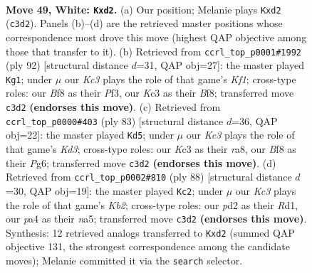 \documentclass[11pt]{article}
\begin{document}
\clearpage

\begin{figure}[p]\centering
\begin{subfigure}{0.46\textwidth}\centering
\resizebox{\linewidth}{!}{%
\newchessgame
\chessboard[
  setfen={5B2/5p1k/5n2/8/p3p2p/P1K4P/1P1p1PR1/1r6 w - - 0 49},
  showmover=false,
  pgfstyle=straightmove, color=movearrow, markmove={c3-d2}
]}
\caption{}
\end{subfigure}\hfill
\begin{subfigure}{0.46\textwidth}\centering
\resizebox{\linewidth}{!}{%
\newchessgame
\chessboard[
  setfen={5B2/8/5n1p/1p1k2p1/5pP1/P4P1P/7r/4RK2 w - - 11 47},
  showmover=false,
  pgfstyle=straightmove, color=movearrow, markmove={f1-g1}
]}
\caption{}
\end{subfigure}
\\[4pt]
\begin{subfigure}{0.46\textwidth}\centering
\resizebox{\linewidth}{!}{%
\newchessgame
\chessboard[
  setfen={R7/p4r1p/3k2pP/2p5/3p1P2/PP6/2PK4/8 b - - 0 42},
  showmover=false,
  pgfstyle=straightmove, color=movearrow, markmove={d6-d5}
]}
\caption{}
\end{subfigure}\hfill
\begin{subfigure}{0.46\textwidth}\centering
\resizebox{\linewidth}{!}{%
\newchessgame
\chessboard[
  setfen={1k3r2/1p4p1/7p/n2pPB1P/Pp1P2P1/8/1K6/3R4 w - - 2 45},
  showmover=false,
  pgfstyle=straightmove, color=movearrow, markmove={b2-c2}
]}
\caption{}
\end{subfigure}
\caption{\textbf{Move 49, White: \texttt{Kxd2}.} (a) Our position; Melanie plays \texttt{Kxd2} (\texttt{c3d2}). Panels (b)--(d) are the retrieved master positions whose correspondence most drove this move (highest QAP objective among those that transfer to it). (b) Retrieved from \texttt{ccrl\_top\_p0001\#1992} (ply 92) [structural distance $d$=31, QAP obj=27]: the master played \texttt{Kg1}; under $\mu$ our \emph{Kc3} plays the role of that game's \emph{Kf1}; cross-type roles: our \emph{B}f8 as their \emph{P}f3, our \emph{K}c3 as their \emph{B}f8; transferred move \texttt{c3d2} \textbf{(endorses this move)}. (c) Retrieved from \texttt{ccrl\_top\_p0000\#403} (ply 83) [structural distance $d$=36, QAP obj=22]: the master played \texttt{Kd5}; under $\mu$ our \emph{Kc3} plays the role of that game's \emph{Kd3}; cross-type roles: our \emph{K}c3 as their \emph{r}a8, our \emph{B}f8 as their \emph{P}g6; transferred move \texttt{c3d2} \textbf{(endorses this move)}. (d) Retrieved from \texttt{ccrl\_top\_p0002\#810} (ply 88) [structural distance $d$=30, QAP obj=19]: the master played \texttt{Kc2}; under $\mu$ our \emph{Kc3} plays the role of that game's \emph{Kb2}; cross-type roles: our \emph{p}d2 as their \emph{R}d1, our \emph{p}a4 as their \emph{n}a5; transferred move \texttt{c3d2} \textbf{(endorses this move)}. Synthesis: 12 retrieved analogs transferred to \texttt{Kxd2} (summed QAP objective 131, the strongest correspondence among the candidate moves); Melanie committed it via the \texttt{search} selector.}
\label{fig:thought-m96}
\end{figure}
\end{document}

